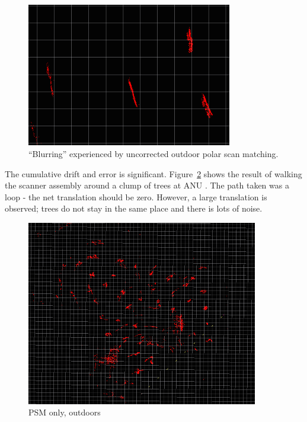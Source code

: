 \documentclass[12pt,oneside,a4paper]{book}
\begin{document}
\begin{figure}[h!]
  \centering
  \includegraphics[width=0.8\textwidth]{figs/blurring}
  \caption{``Blurring'' experienced by uncorrected outdoor polar scan matching.}
  \label{fig:blur-detailed}
\end{figure}

The cumulative drift and error is
significant. Figure~\ref{fig:psm-outdoor} shows the result of walking
the scanner assembly around a clump of trees at ANU . The path taken was a loop - the net translation
should be zero. However, a large translation is observed; trees do not
stay in the same place and there is lots of noise.

\begin{figure}[h!]
  \centering
  \includegraphics[width=0.9\textwidth]{figs/psm-outdoor}
  \caption{PSM only, outdoors}
  \label{fig:psm-outdoor}
\end{figure}
\end{document}
